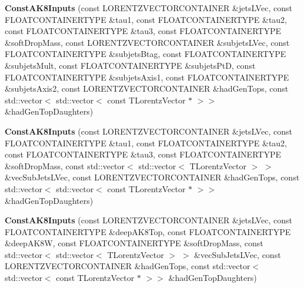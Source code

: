 \begin{DoxyCompactItemize}
\item 
\hypertarget{classttUtility_1_1ConstAK8Inputs_a1cf2872490aaa6267261dbd6134086ae}{{\bfseries Const\-A\-K8\-Inputs} (const L\-O\-R\-E\-N\-T\-Z\-V\-E\-C\-T\-O\-R\-C\-O\-N\-T\-A\-I\-N\-E\-R \&jets\-L\-Vec, const F\-L\-O\-A\-T\-C\-O\-N\-T\-A\-I\-N\-E\-R\-T\-Y\-P\-E \&tau1, const F\-L\-O\-A\-T\-C\-O\-N\-T\-A\-I\-N\-E\-R\-T\-Y\-P\-E \&tau2, const F\-L\-O\-A\-T\-C\-O\-N\-T\-A\-I\-N\-E\-R\-T\-Y\-P\-E \&tau3, const F\-L\-O\-A\-T\-C\-O\-N\-T\-A\-I\-N\-E\-R\-T\-Y\-P\-E \&soft\-Drop\-Mass, const L\-O\-R\-E\-N\-T\-Z\-V\-E\-C\-T\-O\-R\-C\-O\-N\-T\-A\-I\-N\-E\-R \&subjets\-L\-Vec, const F\-L\-O\-A\-T\-C\-O\-N\-T\-A\-I\-N\-E\-R\-T\-Y\-P\-E \&subjets\-Btag, const F\-L\-O\-A\-T\-C\-O\-N\-T\-A\-I\-N\-E\-R\-T\-Y\-P\-E \&subjets\-Mult, const F\-L\-O\-A\-T\-C\-O\-N\-T\-A\-I\-N\-E\-R\-T\-Y\-P\-E \&subjets\-Pt\-D, const F\-L\-O\-A\-T\-C\-O\-N\-T\-A\-I\-N\-E\-R\-T\-Y\-P\-E \&subjets\-Axis1, const F\-L\-O\-A\-T\-C\-O\-N\-T\-A\-I\-N\-E\-R\-T\-Y\-P\-E \&subjets\-Axis2, const L\-O\-R\-E\-N\-T\-Z\-V\-E\-C\-T\-O\-R\-C\-O\-N\-T\-A\-I\-N\-E\-R \&had\-Gen\-Tops, const std\-::vector$<$ std\-::vector$<$ const T\-Lorentz\-Vector $\ast$ $>$$>$ \&had\-Gen\-Top\-Daughters)}\label{classttUtility_1_1ConstAK8Inputs_a1cf2872490aaa6267261dbd6134086ae}

\item 
\hypertarget{classttUtility_1_1ConstAK8Inputs_a35c611a1bff84c38c8b023aa1bddd2d9}{{\bfseries Const\-A\-K8\-Inputs} (const L\-O\-R\-E\-N\-T\-Z\-V\-E\-C\-T\-O\-R\-C\-O\-N\-T\-A\-I\-N\-E\-R \&jets\-L\-Vec, const F\-L\-O\-A\-T\-C\-O\-N\-T\-A\-I\-N\-E\-R\-T\-Y\-P\-E \&tau1, const F\-L\-O\-A\-T\-C\-O\-N\-T\-A\-I\-N\-E\-R\-T\-Y\-P\-E \&tau2, const F\-L\-O\-A\-T\-C\-O\-N\-T\-A\-I\-N\-E\-R\-T\-Y\-P\-E \&tau3, const F\-L\-O\-A\-T\-C\-O\-N\-T\-A\-I\-N\-E\-R\-T\-Y\-P\-E \&soft\-Drop\-Mass, const std\-::vector$<$ std\-::vector$<$ T\-Lorentz\-Vector $>$ $>$ \&vec\-Sub\-Jets\-L\-Vec, const L\-O\-R\-E\-N\-T\-Z\-V\-E\-C\-T\-O\-R\-C\-O\-N\-T\-A\-I\-N\-E\-R \&had\-Gen\-Tops, const std\-::vector$<$ std\-::vector$<$ const T\-Lorentz\-Vector $\ast$ $>$$>$ \&had\-Gen\-Top\-Daughters)}\label{classttUtility_1_1ConstAK8Inputs_a35c611a1bff84c38c8b023aa1bddd2d9}

\item 
\hypertarget{classttUtility_1_1ConstAK8Inputs_abba2d50ce8b06ee440ac0897af781c7a}{{\bfseries Const\-A\-K8\-Inputs} (const L\-O\-R\-E\-N\-T\-Z\-V\-E\-C\-T\-O\-R\-C\-O\-N\-T\-A\-I\-N\-E\-R \&jets\-L\-Vec, const F\-L\-O\-A\-T\-C\-O\-N\-T\-A\-I\-N\-E\-R\-T\-Y\-P\-E \&deep\-A\-K8\-Top, const F\-L\-O\-A\-T\-C\-O\-N\-T\-A\-I\-N\-E\-R\-T\-Y\-P\-E \&deep\-A\-K8\-W, const F\-L\-O\-A\-T\-C\-O\-N\-T\-A\-I\-N\-E\-R\-T\-Y\-P\-E \&soft\-Drop\-Mass, const std\-::vector$<$ std\-::vector$<$ T\-Lorentz\-Vector $>$ $>$ \&vec\-Sub\-Jets\-L\-Vec, const L\-O\-R\-E\-N\-T\-Z\-V\-E\-C\-T\-O\-R\-C\-O\-N\-T\-A\-I\-N\-E\-R \&had\-Gen\-Tops, const std\-::vector$<$ std\-::vector$<$ const T\-Lorentz\-Vector $\ast$ $>$$>$ \&had\-Gen\-Top\-Daughters)}\label{classttUtility_1_1ConstAK8Inputs_abba2d50ce8b06ee440ac0897af781c7a}


\end{DoxyCompactItemize}
